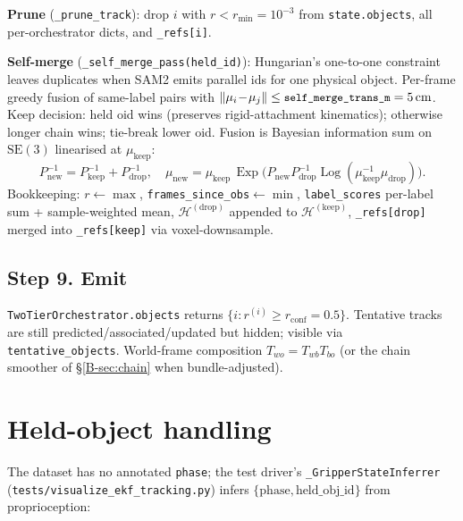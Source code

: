 \documentclass[11pt]{article}
\DeclareMathOperator{\Exp}{Exp}
\DeclareMathOperator{\Log}{Log}
\newcommand{\SE}{\mathrm{SE}(3)}
\newcommand{\code}[1]{\texttt{\small #1}}
\begin{document}
\textbf{Prune} (\code{\_prune\_track}): drop $i$ with $r<r_{\min}=10^{-3}$
from \code{state.objects}, all per-orchestrator dicts, and \code{\_refs[i]}.

\textbf{Self-merge} (\code{\_self\_merge\_pass(held\_id)}): Hungarian's
one-to-one constraint leaves duplicates when SAM2 emits parallel ids for
one physical object. Per-frame greedy fusion of same-label pairs with
$\|\mu_i\!-\!\mu_j\|\le \code{self\_merge\_trans\_m}=5\,\text{cm}$. Keep
decision: held oid wins (preserves rigid-attachment kinematics);
otherwise longer chain wins; tie-break lower oid. Fusion is Bayesian
information sum on $\SE$ linearised at $\mu_{\text{keep}}$:
\begin{equation}
   P^{-1}_{\text{new}} = P^{-1}_{\text{keep}}+P^{-1}_{\text{drop}}, \quad
   \mu_{\text{new}} = \mu_{\text{keep}}\,
      \Exp\!\bigl(P_{\text{new}}P^{-1}_{\text{drop}}\Log(\mu_{\text{keep}}^{-1}\mu_{\text{drop}})\bigr).
\end{equation}
Bookkeeping: $r\!\leftarrow\!\max$, \code{frames\_since\_obs}$\leftarrow\!\min$,
\code{label\_scores} per-label sum + sample-weighted mean,
$\mathcal H^{(\text{drop})}$ appended to $\mathcal H^{(\text{keep})}$,
\code{\_refs[drop]} merged into \code{\_refs[keep]} via voxel-downsample.

\subsection{Step 9. Emit}

\code{TwoTierOrchestrator.objects} returns
$\{i:r^{(i)}\!\ge\!r_{\text{conf}}\!=\!0.5\}$. Tentative tracks are still
predicted/associated/updated but hidden; visible via
\code{tentative\_objects}. World-frame composition $T_{wo}\!=\!T_{wb}T_{bo}$
(or the chain smoother of \S\ref{B-sec:chain} when bundle-adjusted).

\section{Held-object handling}\label{sec:held}

The dataset has no annotated \code{phase}; the test driver's
\code{\_GripperStateInferrer} (\code{tests/visualize\_ekf\_tracking.py})
infers $\{\text{phase},\text{held\_obj\_id}\}$ from proprioception:
\end{document}
